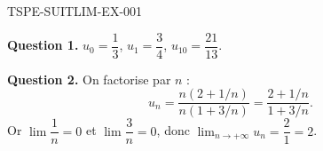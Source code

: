 \begin{corrige}{TSPE-SUITLIM-EX-001}


\textbf{Question 1.}
$u_0 = \dfrac{1}{3}$, \quad $u_1 = \dfrac{3}{4}$, \quad $u_{10} = \dfrac{21}{13}$.


\textbf{Question 2.} On factorise par $n$ :
\[
u_n = \frac{n(2 + 1/n)}{n(1 + 3/n)} = \frac{2 + 1/n}{1 + 3/n}.
\]
Or $\lim \dfrac{1}{n} = 0$ et $\lim \dfrac{3}{n} = 0$, donc $\lim_{n \to +\infty} u_n = \dfrac{2}{1} = \boxed{2}$.

\end{corrige}

